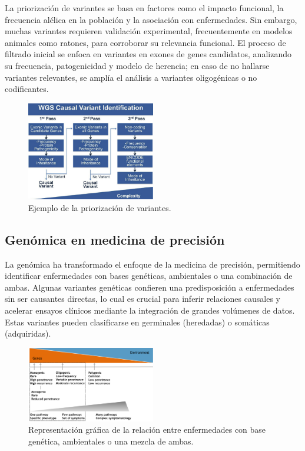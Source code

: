 La priorización de variantes se basa en factores como el impacto funcional, la frecuencia alélica en la población y la asociación con enfermedades. Sin embargo, muchas variantes requieren validación experimental, frecuentemente en modelos animales como ratones, para corroborar su relevancia funcional. El proceso de filtrado inicial se enfoca en variantes en exones de genes candidatos, analizando su frecuencia, patogenicidad y modelo de herencia; en caso de no hallarse variantes relevantes, se amplía el análisis a variantes oligogénicas o no codificantes.

\begin{figure}[htbp]
\centering
\includegraphics[width = 0.5\textwidth]{figs/variant-priorization.png}
\caption{Ejemplo de la priorización de variantes.}
\end{figure}

\subsection{Genómica en medicina de precisión}
La genómica ha transformado el enfoque de la medicina de precisión, permitiendo identificar enfermedades con bases genéticas, ambientales o una combinación de ambas. Algunas variantes genéticas confieren una predisposición a enfermedades sin ser causantes directas, lo cual es crucial para inferir relaciones causales y acelerar ensayos clínicos mediante la integración de grandes volúmenes de datos. Estas variantes pueden clasificarse en germinales (heredadas) o somáticas (adquiridas).

\begin{figure}[htbp]
\centering
\includegraphics[width = 0.5\textwidth]{figs/genetic-environment.png}
\caption{Representación gráfica de la relación entre enfermedades con base genética, ambientales o una mezcla de ambas.}
\end{figure}

